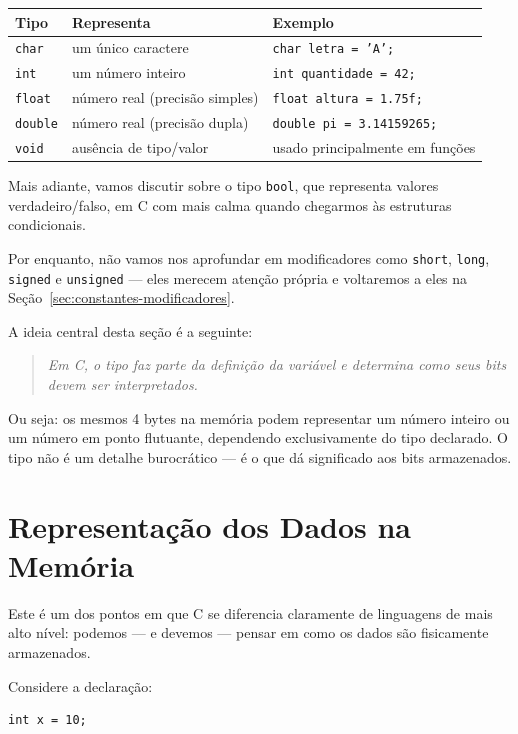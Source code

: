 \begin{center}
\begin{tabular}{|l|l|l|}
\hline
\textbf{Tipo} & \textbf{Representa} & \textbf{Exemplo} \\
\hline
\texttt{char} & um único caractere & \texttt{char letra = 'A';} \\
\hline
\texttt{int} & um número inteiro & \texttt{int quantidade = 42;} \\
\hline
\texttt{float} & número real (precisão simples) & \texttt{float altura = 1.75f;} \\
\hline
\texttt{double} & número real (precisão dupla) & \texttt{double pi = 3.14159265;} \\
\hline
\texttt{void} & ausência de tipo/valor & usado principalmente em funções \\
\hline
\end{tabular}
\end{center}

Mais adiante, vamos discutir sobre o tipo \texttt{bool}, que representa valores verdadeiro/falso, em C com mais calma quando chegarmos às estruturas condicionais.

Por enquanto, não vamos nos aprofundar em modificadores como \texttt{short}, \texttt{long}, \texttt{signed} e \texttt{unsigned} — eles merecem atenção própria e voltaremos a eles na Seção~\ref{sec:constantes-modificadores}.

A ideia central desta seção é a seguinte:

\begin{quote}
\textit{Em C, o tipo faz parte da definição da variável e determina como seus bits devem ser interpretados.}
\end{quote}

Ou seja: os mesmos 4 bytes na memória podem representar um número inteiro ou um número em ponto flutuante, dependendo exclusivamente do tipo declarado. O tipo não é um detalhe burocrático — é o que dá significado aos bits armazenados.

\section{Representação dos Dados na Memória}
Este é um dos pontos em que C se diferencia claramente de linguagens de mais alto nível: podemos — e devemos — pensar em como os dados são fisicamente armazenados.

Considere a declaração:

\begin{lstlisting}
int x = 10;
\end{lstlisting}

